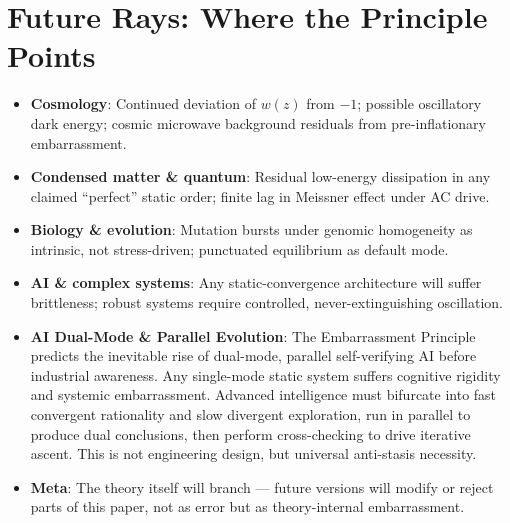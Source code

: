 \documentclass[10pt,a4paper]{article}
\begin{document}
\section*{Future Rays: Where the Principle Points}
\begin{itemize}
\item \textbf{Cosmology}: Continued deviation of $w(z)$ from $-1$; possible oscillatory dark energy; cosmic microwave background residuals from pre-inflationary embarrassment.
\item \textbf{Condensed matter \& quantum}: Residual low-energy dissipation in any claimed “perfect” static order; finite lag in Meissner effect under AC drive.
\item \textbf{Biology \& evolution}: Mutation bursts under genomic homogeneity as intrinsic, not stress-driven; punctuated equilibrium as default mode.
\item \textbf{AI \& complex systems}: Any static-convergence architecture will suffer brittleness; robust systems require controlled, never-extinguishing oscillation.
\item \textbf{AI Dual-Mode \& Parallel Evolution}: The Embarrassment Principle predicts the inevitable rise of dual-mode, parallel self-verifying AI before industrial awareness. Any single-mode static system suffers cognitive rigidity and systemic embarrassment. Advanced intelligence must bifurcate into fast convergent rationality and slow divergent exploration, run in parallel to produce dual conclusions, then perform cross-checking to drive iterative ascent. This is not engineering design, but universal anti-stasis necessity.
\item \textbf{Meta}: The theory itself will branch — future versions will modify or reject parts of this paper, not as error but as theory-internal embarrassment.
\end{itemize}
\end{document}
